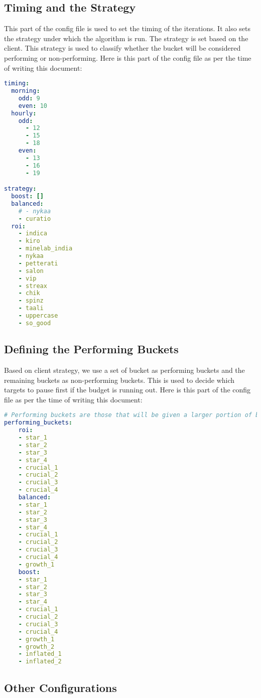 \subsection{Timing and the Strategy}

This part of the config file is used to set the timing of the iterations. It also sets the strategy under which the algorithm is run. The strategy is set based on the client. This strategy is used to classify whether the bucket will be considered performing or non-performing. Here is this part of the config file as per the time of writing this document:

\begin{lstlisting}[language=yaml]
    timing:
  morning:
    odd: 9
    even: 10
  hourly:
    odd:
      - 12
      - 15
      - 18
    even:
      - 13
      - 16
      - 19

strategy:
  boost: []
  balanced:
    # - nykaa
    - curatio
  roi:
    - indica
    - kiro
    - minelab_india
    - nykaa
    - petterati
    - salon
    - vip
    - streax
    - chik
    - spinz
    - taali
    - uppercase
    - so_good
\end{lstlisting}

\subsection{Defining the Performing Buckets}

Based on client strategy, we use a set of bucket as performing buckets and the remaining buckets as non-performing buckets. This is used to decide which targets to pause first if the budget is running out. Here is this part of the config file as per the time of writing this document:

\begin{lstlisting}[language=yaml]
# Performing buckets are those that will be given a larger portion of budget. The buckets will depend on the client strategy.
performing_buckets:
    roi:
    - star_1
    - star_2
    - star_3
    - star_4
    - crucial_1
    - crucial_2
    - crucial_3
    - crucial_4
    balanced:
    - star_1
    - star_2
    - star_3
    - star_4
    - crucial_1
    - crucial_2
    - crucial_3
    - crucial_4
    - growth_1
    boost:
    - star_1
    - star_2
    - star_3
    - star_4
    - crucial_1
    - crucial_2
    - crucial_3
    - crucial_4
    - growth_1
    - growth_2
    - inflated_1
    - inflated_2
\end{lstlisting}

\subsection{Other Configurations}

